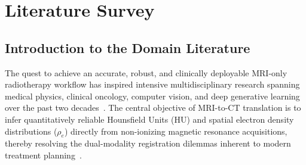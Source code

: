 \chapter{Literature Survey}

\section{Introduction to the Domain Literature}
The quest to achieve an accurate, robust, and clinically deployable MRI-only radiotherapy workflow has inspired intensive multidisciplinary research spanning medical physics, clinical oncology, computer vision, and deep generative learning over the past two decades~\cite{edmund2017review}. The central objective of MRI-to-CT translation is to infer quantitatively reliable Hounsfield Units (HU) and spatial electron density distributions ($\rho_e$) directly from non-ionizing magnetic resonance acquisitions, thereby resolving the dual-modality registration dilemmas inherent to modern treatment planning~\cite{edmund2017review,thummerer2023synthrad2023}. 

